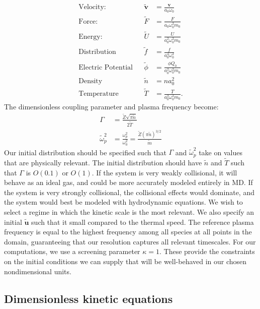 \documentclass{article}
\begin{document}
\begin{align*}
\text{Velocity:}&			&	\tilde{\mathbf{v}} 	 &= \frac{\mathbf{v}}{a_0\omega_0} 				\\
\text{Force:}&				&	\tilde{F} 	 &= \frac{F}{a_0\omega_0^2m_0}			\\
\text{Energy:}&				&	\tilde{U} 	 &= \frac{U}{a_0^2\omega_0^2m_0} 		\\
\text{Distribution}& 		&	\tilde{f} 	 &= \frac{f}{a_0^4\omega_0^2}			\\
\text{Electric Potential}&	&	\tilde{\phi} &= \frac{\phi Q_0}{a_0^2\omega_0^2m_0}	\\
\text{Density}&				&	\tilde{n}	 &= na_0^2								\\
\text{Temperature}&			&	\tilde{T}	 &=	\frac{T}{a_0^2\omega_0^2m_0}.		
\end{align*}The dimensionless coupling parameter and plasma frequency become:
\begin{align}
\Gamma&=\frac{\tilde{Z}\sqrt{\pi\tilde{n}}}{2\tilde{T}}\\
\tilde{\omega}_p^2&=\frac{\omega_p^2}{\omega_0^2}=\frac{\tilde{Z}(\pi\tilde{n})^{3/2}}{\tilde{m}}
\end{align}Our initial distribution should be specified such that $\Gamma$ and $\tilde{\omega}_p^2$ take on values that are physically relevant. The initial distribution should have $\tilde{n}$ and $\tilde{T}$ such that $\Gamma$ is $O(0.1)$ or $O(1)$. If the system is very weakly collisional, it will behave as an ideal gas, and could be more accurately modeled entirely in MD. If the system is very strongly collisional, the collisional effects would dominate, and the system would best be modeled with hydrodynamic equations. We wish to select a regime in which the kinetic scale is the most relevant. We also specify an initial $\tilde{\mathbf{u}}$ such that it small compared to the thermal speed. The reference plasma frequency is equal to the highest frequency among all species at all points in the domain, guaranteeing that our resolution captures all relevant timescales. For our computations, we use a screening parameter $\kappa=1$. These provide the constraints on the initial conditions we can supply that will be well-behaved in our chosen nondimensional units.
\subsection{Dimensionless kinetic equations}
\end{document}
